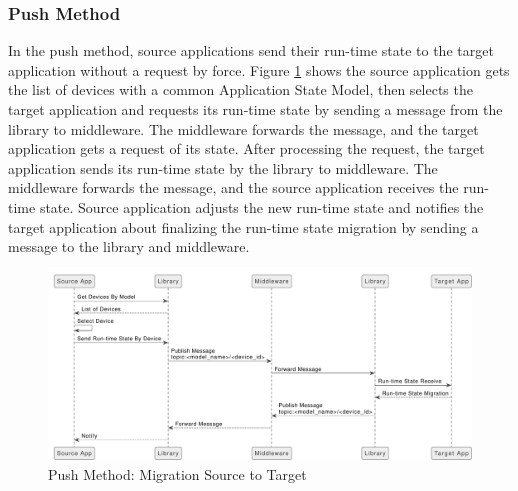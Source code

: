 \subsubsection{Push Method}
In the push method, source applications send their run-time state to the target application without a request by force. Figure \ref{fig:Migration-Source-to-Target-Push-Method} shows the source application gets the list of devices with a common Application State Model, then selects the target application and requests its run-time state by sending a message from the library to middleware. The middleware forwards the message, and the target application gets a request of its state. After processing the request, the target application sends its run-time state by the library to middleware. The middleware forwards the message, and the source application receives the run-time state. Source application adjusts the new run-time state and notifies the target application about finalizing the run-time state migration by sending a message to the library and middleware. 

\FloatBarrier \begin{figure}[H]
    \includegraphics[width=\linewidth]{../figures/Migration-Source-to-Target-Push-Method}
    \centering
    \caption{Push Method: Migration Source to Target}
    \label{fig:Migration-Source-to-Target-Push-Method}
\end{figure} \FloatBarrier

